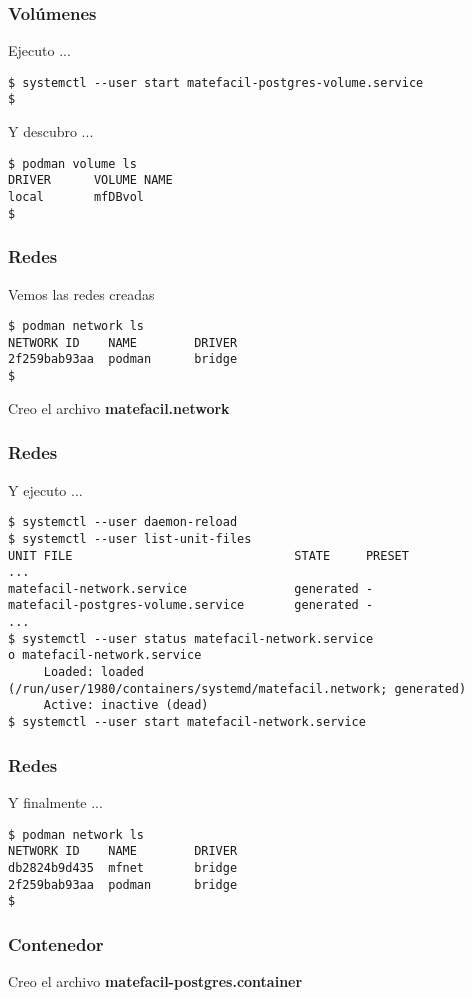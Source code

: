 \begin{frame}[fragile]
  \frametitle{Volúmenes}
  Ejecuto ...
  \begin{lstlisting}
$ systemctl --user start matefacil-postgres-volume.service
$
  \end{lstlisting}
  \pausa
  Y descubro ...
  \begin{lstlisting}
$ podman volume ls
DRIVER      VOLUME NAME
local       mfDBvol
$
  \end{lstlisting}
\end{frame}

\begin{frame}[fragile]
  \frametitle{Redes}
  Vemos las redes creadas
  \begin{lstlisting}
$ podman network ls
NETWORK ID    NAME        DRIVER
2f259bab93aa  podman      bridge
$
  \end{lstlisting}
  Creo el archivo \textbf{matefacil.network}
  \pausa
  
\end{frame}

\begin{frame}[fragile]
  \frametitle{Redes}
  Y ejecuto ...
  \begin{lstlisting}
$ systemctl --user daemon-reload
$ systemctl --user list-unit-files
UNIT FILE                               STATE     PRESET
...
matefacil-network.service               generated -
matefacil-postgres-volume.service       generated -
...
$ systemctl --user status matefacil-network.service
o matefacil-network.service
     Loaded: loaded (/run/user/1980/containers/systemd/matefacil.network; generated)
     Active: inactive (dead)
$ systemctl --user start matefacil-network.service
  \end{lstlisting}
\end{frame}

\begin{frame}[fragile]
  \frametitle{Redes}
  Y finalmente ...
  \begin{lstlisting}
$ podman network ls
NETWORK ID    NAME        DRIVER
db2824b9d435  mfnet       bridge
2f259bab93aa  podman      bridge
$
  \end{lstlisting}
\end{frame}

\begin{frame}[fragile]
  \frametitle{Contenedor}
  Creo el archivo \textbf{matefacil-postgres.container}
  
\end{frame}

